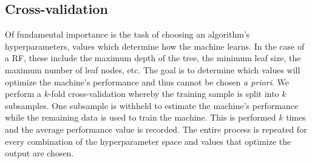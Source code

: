 \documentclass[twocolumn]{aastex6}
\begin{document}

\subsection{Cross-validation}
Of fundamental importance is the task of choosing an algorithm's hyperparameters, 
values which determine how the machine learns.  In the case of a RF, these include
 the maximum depth of the tree, the minimum leaf size, the maximum
number of leaf nodes, etc. The goal is to determine which values will optimize 
the machine's performance and thus cannot be chosen \textit{a priori}. 
We perform a $k$-fold cross-validation whereby the 
training sample is split into $k$ subsamples. One subsample is withheld to 
estimate the machine's performance while the remaining data is used to train the machine. 
This is performed $k$ times and the average performance
value is recorded. The entire process is repeated for every combination of the 
 hyperparameter space and values that optimize the output are chosen. 

 
\end{document}
